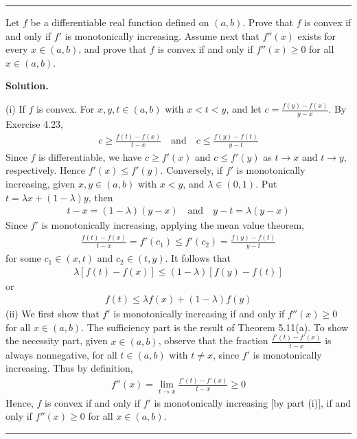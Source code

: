 \documentclass[12pt]{article}
\theoremstyle{definition}
\begin{document}
\bigskip\noindent\hrule\bigskip

Let $f$ be a differentiable real function defined on $(a,b)$. Prove that $f$ is convex if and only if $f'$ is monotonically increasing. Assume next that $f''(x)$ exists for every $x\in(a,b)$, and prove that $f$ is convex if and only if $f''(x)\ge 0$ for all $x\in(a,b)$.

\smallskip
\noindent\textbf{Solution.}\quad

(i) If $f$ is convex. For $x,y,t\in(a,b)$ with $x<t<y$, and let $c=\frac{f(y)-f(x)}{y-x}$. By Exercise 4.23,
\begin{align*}
c\ge\frac{f(t)-f(x)}{t-x}\quad\mbox{and}\quad
c\le\frac{f(y)-f(t)}{y-t}
\end{align*}
Since $f$ is differentiable, we have $c\ge f'(x)$ and $c\le f'(y)$ as $t\to x$ and $t\to y$, respectively. Hence $f'(x)\le f'(y)$. Conversely, if $f'$ is monotonically increasing, given $x,y\in(a,b)$ with $x<y$, and $\lambda\in(0,1)$. Put $t=\lambda x+(1-\lambda)y$, then
\begin{align*}
t-x=(1-\lambda)(y-x)\quad\mbox{and}\quad
y-t=\lambda(y-x)
\end{align*}
Since $f'$ is monotonically increasing, applying the mean value theorem,
\begin{align*}
\frac{f(t)-f(x)}{t-x}=f'(c_1)\le f'(c_2)=\frac{f(y)-f(t)}{y-t}
\end{align*}
for some $c_1\in(x,t)$ and $c_2\in(t,y)$. It follows that
\begin{align*}
\lambda\left[f(t)-f(x)\right]
\le(1-\lambda)\left[f(y)-f(t)\right]
\end{align*}
or
\begin{align*}
f(t)
\le\lambda f(x)+(1-\lambda)f(y)
\end{align*}
(ii) We first show that $f'$ is monotonically increasing if and only if $f''(x)\ge 0$ for all $x\in(a,b)$. The sufficiency part is the result of Theorem 5.11(a). To show the necessity part, given $x\in(a,b)$, observe that the fraction $\frac{f'(t)-f'(x)}{t-x}$ is always nonnegative, for all $t\in(a,b)$ with $t\ne x$, since $f'$ is monotonically increasing. Thus by definition,
\begin{align*}
f''(x)=\lim_{t\to x}\frac{f'(t)-f'(x)}{t-x}\ge 0
\end{align*}
Hence, $f$ is convex if and only if $f'$ is monotonically increasing [by part (i)], if and only if $f''(x)\ge 0$ for all $x\in(a,b)$.



\bigskip\noindent\hrule\bigskip
\end{document}
